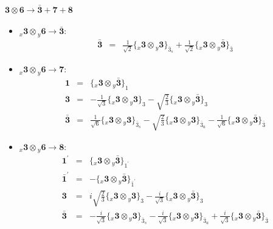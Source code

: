 \documentclass[english]{article}
\newcommand{\rep}[1]{\mathbf{#1}}
\newcommand{\repx}[2]{{}_{#2}\mathbf{#1}}
\newcommand{\subcg}[3]{\big\{ \repx{#1}{x}\otimes\repx{#2}{y}\big\}^{}_{#3}}
\begin{document}
\paragraph*{\Large $\rep{3}\otimes\rep{6}\to\rep{\bar{3}}+\rep{7}+\rep{8}$}
\begin{itemize}
\item $\repx{3}{x}\otimes\repx{6}{y}\to\rep{\bar{3}}$:
\begin{eqnarray*}
\rep{\bar{3}} &=& \frac{1}{\sqrt{2}}\subcg{3}{3}{\bar{3}_{s}}+\frac{1}{\sqrt{2}}\subcg{3}{\bar{3}}{\bar{3}}
\end{eqnarray*}
\item $\repx{3}{x}\otimes\repx{6}{y}\to\rep{7}$:
\begin{eqnarray*}
\rep{1} &=& \subcg{3}{\bar{3}}{1}
\\
\rep{3} &=& -\frac{1}{\sqrt{3}}\subcg{3}{3}{3}-\sqrt{\frac{2}{3}}\subcg{3}{\bar{3}}{3}
\\
\rep{\bar{3}} &=& \frac{1}{\sqrt{6}}\subcg{3}{3}{\bar{3}_{s}}-\sqrt{\frac{2}{3}}\subcg{3}{3}{\bar{3}_{a}}-\frac{1}{\sqrt{6}}\subcg{3}{\bar{3}}{\bar{3}}
\end{eqnarray*}
\item $\repx{3}{x}\otimes\repx{6}{y}\to\rep{8}$:
\begin{eqnarray*}
\rep{1^{\prime}} &=& \subcg{3}{\bar{3}}{1^{\prime}}
\\
\rep{\bar{1}^{\prime}} &=& -\subcg{3}{\bar{3}}{\bar{1}^{\prime}}
\\
\rep{3} &=& i \sqrt{\frac{2}{3}}\subcg{3}{3}{3}-\frac{i}{\sqrt{3}}\subcg{3}{\bar{3}}{3}
\\
\rep{\bar{3}} &=& -\frac{i}{\sqrt{3}}\subcg{3}{3}{\bar{3}_{s}}-\frac{i}{\sqrt{3}}\subcg{3}{3}{\bar{3}_{a}}+\frac{i}{\sqrt{3}}\subcg{3}{\bar{3}}{\bar{3}}
\end{eqnarray*}
\end{itemize}
\end{document}
